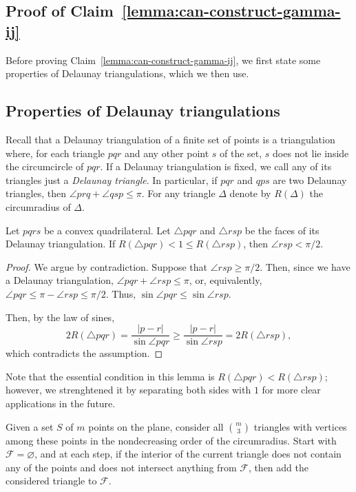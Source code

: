 \appendix
\begin{appendices}

\section{Proof of Claim~\ref{lemma:can-construct-gamma-ij}}\label{section:proof-of-claim}

Before proving Claim~\ref{lemma:can-construct-gamma-ij}, we first state some properties of Delaunay triangulations, which we then use.

\subsection{Properties of Delaunay triangulations}

Recall that a Delaunay triangulation of a finite set of points is a triangulation where, for each triangle $pqr$ and any other point $s$ of the set, $s$ does not lie inside the circumcircle of $pqr$. If a Delaunay triangulation is fixed, we call any of its triangles just a \emph{Delaunay triangle}. In particular, if $pqr$ and $qps$ are two Delaunay triangles, then $\angle prq + \angle qsp\leq\pi$. For any triangle $\Delta$ denote by $R(\Delta)$ the circumradius of $\Delta$.

\begin{lemma}\label{lemma:no-obtuse-in-delaunay}
Let $pqrs$ be a convex quadrilateral. Let $\triangle pqr$ and $\triangle rsp$ be the faces of its Delaunay triangulation. If $R(\triangle pqr) < 1 \leq R(\triangle rsp)$, then $\angle rsp < \pi/2$.
\end{lemma}

\begin{proof}
We argue by contradiction. Suppose that $\angle rsp \geq \pi/2$. Then, since we have a Delaunay triangulation, $\angle pqr + \angle rsp \leq \pi$, or, equivalently, $\angle pqr \leq \pi - \angle rsp \leq \pi/2$. Thus, $\sin\angle pqr \leq \sin\angle rsp$.

Then, by the law of sines, $$2R(\triangle pqr) = \frac{|p - r|}{\sin\angle pqr} \geq \frac{|p - r|}{\sin\angle rsp} = 2R(\triangle rsp),$$ which contradicts the assumption.
\end{proof}

Note that the essential condition in this lemma is $R(\triangle pqr) < R(\triangle rsp)$; however, we strenghtened it by separating both sides with $1$ for more clear applications in the future.

\begin{lemma}\label{lemma:delaunay-sorted-process}
Given a set $S$ of $m$ points on the plane, consider all $\binom{m}{3}$ triangles with vertices among these points in the nondecreasing order of the circumradius. Start with $\mathcal{F} = \varnothing$, and at each step, if the interior of the current triangle does not contain any of the points and does not intersect anything from $\mathcal{F}$, then add the considered triangle to $\mathcal{F}$.


\end{lemma}
\end{appendices}
